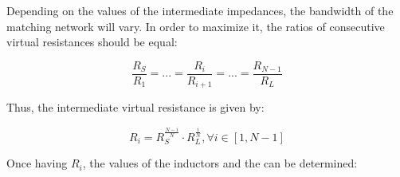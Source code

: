 Depending on the values of the intermediate impedances, the bandwidth of the matching network will vary. In order to maximize it, the ratios of consecutive virtual resistances should be equal:

\begin{equation}
  \frac{R_S}{R_1} = ... = \frac{R_{i}}{R_{i+1}} = ... = \frac{R_{N-1}}{R_{L}}
\end{equation}

\noindent Thus, the intermediate virtual resistance is given by:

\begin{equation}
R_i = R_S^{\frac{N-i}{N}} \cdot R_L^{\frac{i}{N}}, \forall i \in [1, N-1]
\end{equation}

\noindent Once having $R_i$, the values of the inductors and the can be determined:

